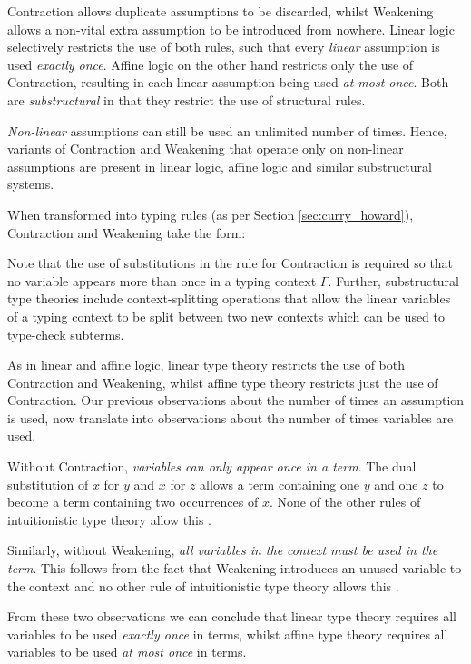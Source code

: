 \documentclass[]{unswthesis}
\let\i\textit
\begin{document}
Contraction allows duplicate assumptions to be discarded, whilst Weakening allows a non-vital extra assumption to be introduced from nowhere. Linear logic \cite{girard87} selectively restricts the use of both rules, such that every \i{linear} assumption is used \i{exactly once}. Affine logic on the other hand restricts only the use of Contraction, resulting in each linear assumption being used \i{at most once}. Both are \i{substructural} in that they restrict the use of structural rules.

\i{Non-linear} assumptions can still be used an unlimited number of times. Hence, variants of Contraction and Weakening that operate only on non-linear assumptions are present in linear logic, affine logic and similar substructural systems.

When transformed into typing rules (as per Section \ref{sec:curry_howard}), Contraction and Weakening take the form:

Note that the use of substitutions in the rule for Contraction is required so that no variable appears more than once in a typing context $\Gamma$. Further, substructural type theories include context-splitting operations that allow the linear variables of a typing context to be split between two new contexts which can be used to type-check subterms.

As in linear and affine logic, linear type theory restricts the use of both Contraction and Weakening, whilst affine type theory restricts just the use of Contraction. Our previous observations about the number of times an assumption is used, now translate into observations about the number of times variables are used.

Without Contraction, \i{variables can only appear once in a term}. The dual substitution of $x$ for $y$ and $x$ for $z$ allows a term containing one $y$ and one $z$ to become a term containing two occurrences of $x$. None of the other rules of intuitionistic type theory allow this \cite{wadler93}.

Similarly, without Weakening, \i{all variables in the context must be used in the term}. This follows from the fact that Weakening introduces an unused variable to the context and no other rule of intuitionistic type theory allows this \cite{wadler93}.

From these two observations we can conclude that linear type theory requires all variables to be used \i{exactly once} in terms, whilst affine type theory requires all variables to be used \i{at most once} in terms.
\end{document}
